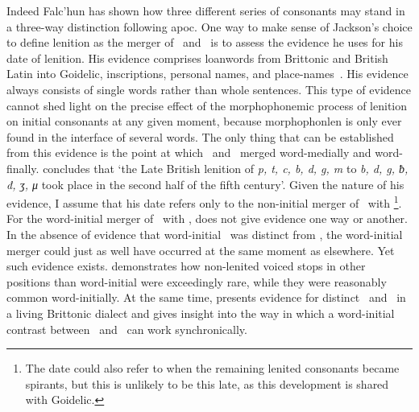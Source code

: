 Indeed Falc'hun has shown how three different series of consonants may stand in a three-way distinction following \gls{apoc}. One way to make sense of Jackson's choice to define lenition as the merger of \lT\ and \xD\  is to assess the evidence he uses for his date of lenition. His evidence comprises loanwords from Brittonic and British Latin into Goidelic, inscriptions, personal names, and place-names~\autocite[§§~133–134]{jackson_language_1953}. His evidence always consists of single words rather than whole sentences. This type of evidence cannot shed light on the precise effect of the morphophonemic process of lenition on initial consonants at any given moment, because \gls{morphophonlen} is only ever found in the interface of several words. The only thing that can be established from this evidence is the point at which \lT\ and \xD\ merged word-medially and word-finally. \Textcite[§~142]{jackson_language_1953} concludes that `the Late British lenition of \textit{p, t, c, b, d, g, m} to \textit{b, d, g, ƀ, đ, ʒ, μ} took place in the second half of the fifth century'. Given the nature of his evidence, I assume that his date  refers only to the non-initial merger of \lT\ with \xD\footnote{The date could also refer to when the remaining lenited consonants became spirants, but this is unlikely to be this late, as this development is shared with Goidelic.}. For the word-initial merger of \lT\ with \xD, \textcite{jackson_language_1953} does not give evidence one way or another. In the absence of evidence that word-initial \lT\ was distinct from \xD,  the word-initial merger could just as well have occurred at the same moment as elsewhere. Yet such evidence exists.  \Textcite{martinet_celtic_1952} demonstrates how non-lenited voiced stops in other positions than word-initial were exceedingly rare, while they were reasonably common word-initially. At the same time, \textcite{falchun_systeme_1951} presents evidence for distinct \xD\ and \lT\ in a living Brittonic dialect and gives  insight into the way in which a word-initial contrast between \xD\ and \lT\ can work synchronically. 


